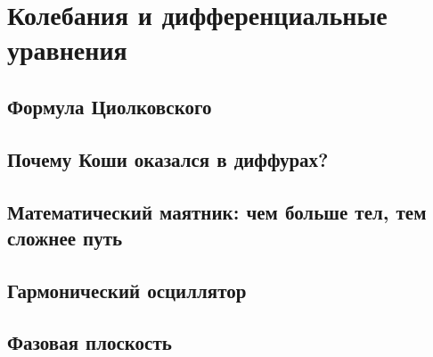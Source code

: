 \section{Колебания и дифференциальные уравнения}
\subsection{Формула Циолковского}
\subsection{Почему Коши оказался в диффурах?}
\subsection{Математический маятник: чем больше тел, тем сложнее путь}
\subsection{Гармонический осциллятор}
\subsection{Фазовая плоскость}